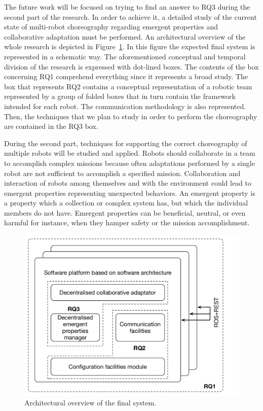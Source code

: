 The future work will be focused on trying to find an answer to RQ3 during the second part of the research.
In order to achieve it, a detailed study of the current state of multi-robot choreography regarding emergent properties and collaborative adaptation must be performed.
An architectural overview of the whole research is depicted in Figure~\ref{fig:overview}.
In this figure the expected final system is represented in a schematic way.
The aforementioned conceptual and temporal division of the research is expressed with dot-lined boxes.
The contents of the box concerning RQ1 comprehend everything since it represents a broad study.
The box that represents RQ2 contains a conceptual representation of a robotic team represented by a group of folded boxes that in turn contain the framework intended for each robot.
The communication methodology is also represented.
Then, the techniques that we plan to study in order to perform the choreography are contained in the RQ3 box.

During the second part, techniques for supporting the correct choreography of multiple robots will be studied and applied.
Robots should collaborate in a team to accomplish complex missions because often adaptations performed by a single robot are not sufficient to accomplish a specified mission. 
Collaboration and interaction of robots among themselves and with the environment could lead to emergent properties representing unexpected behaviors. 
An emergent property is a property which a collection or complex system has, but which the individual members do not have.
Emergent properties can be beneficial, neutral, or even harmful for instance, when they hamper safety or the mission accomplishment.

\begin{figure}[!t]
\begin{center}
\includegraphics[width=0.9\linewidth]{Figures/research.pdf}
\caption{Architectural overview of the final system.}
\label{fig:overview}
\end{center}
\end{figure}